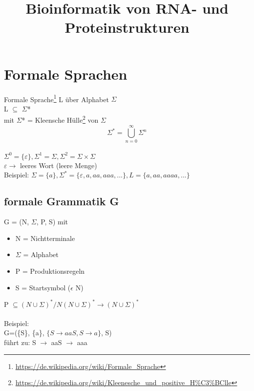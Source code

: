 \documentclass[12pt]{article}
\title{\Huge\textbf{Bioinformatik von RNA- und Proteinstrukturen}}
\author{}
\date{}
\begin{document}
\begin{titlepage}

\maketitle
\thispagestyle{empty}
\end{titlepage}
\newpage

\begin{titlepage}
\tableofcontents
\thispagestyle{empty}
\end{titlepage}
\newpage

\section{Formale Sprachen}

Formale Sprache\footnote{\url{https://de.wikipedia.org/wiki/Formale\_Sprache}}
L über Alphabet $\Sigma$\\
L $\subseteq$ $\Sigma$*\\
mit $\Sigma$* = Kleensche Hülle\footnote{\url{https://de.wikipedia.org/wiki/Kleenesche\_und\_positive\_H\%C3\%BClle}} von $\Sigma$\\


$$\Sigma^* = \bigcup_{n=0}^{\infty} \Sigma^{n}$$\\
$\Sigma^0 = \{\varepsilon\}, \Sigma^1 = \Sigma, \Sigma^2 = \Sigma \times \Sigma$\\
$\varepsilon \to$ leeres Wort (leere Menge)\\

Beispiel: $\Sigma = \{a\}, \Sigma^*=\{\varepsilon, a, aa, aaa, ...\}, L = \{a, aa, aaaa, ...\}$

\subsection{formale Grammatik G}

G = (N, $\Sigma$, P, S) mit\\
\begin{itemize}
	\item N = Nichtterminale
	\item $\Sigma$ = Alphabet
	\item P = Produktionsregeln
	\item S = Startsymbol ($\epsilon$ N)
\end{itemize}

P $\subseteq (N \cup \Sigma)^* / N(N \cup \Sigma)^* \to (N \cup \Sigma)^*$\\
\\
Beispiel:\\
G=(\{S\}, \{a\}, $\{S \to aaS, S \to a\}$, S)\\
führt zu: S $\to$ aaS $\to$ aaa
\end{document}
